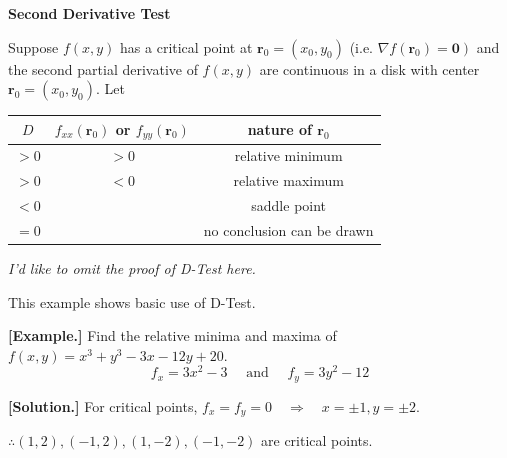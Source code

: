 \documentclass[11pt, a4paper]{MATH2023}
\newcommand{\eg}{\textbf{[Example.] }}
\newcommand{\sol}{\textbf{[Solution.] }}
\begin{document}
\begin{spacing}{1.3}
    \vspace{0.3in}
    {\bf Second Derivative Test}

    Suppose $f(x, y)$ has a critical point at $\mathbf{r}_{0}=\left(x_{0}, y_{0}\right)$ 
    (i.e. $\left.\nabla f\left(\mathbf{r}_{0}\right)=\mathbf{0}\right)$ and the second partial 
    derivative of $f(x, y)$ are continuous in a disk with center $\mathbf{r}_{0}=\left(x_{0}, y_{0}\right) .$ Let
    \begin{center}
    \end{center}
    
    \begin{center}
        \begin{tabular}{c|c|c}
            \hline\hline 
            $D$ & $f_{x x}\left(\mathbf{r}_{0}\right)$ or $f_{y y}\left(\mathbf{r}_{0}\right)$ & nature of $\mathbf{r}_{0}$ \\\hline\hline
            $>0$ & $>0$ & relative minimum \\\hline
            $>0$ & $<0$ & relative maximum \\\hline
            $<0$ & & saddle point \\\hline
            $=0$ & & no conclusion can be drawn \\\hline
        \end{tabular}
    \end{center}
    
    \vspace{0.4in}
    {\it I'd like to omit the proof of D-Test here.}

    \vspace{0.8in}
    {\blue This example shows basic use of D-Test.}

    \eg Find the relative minima and maxima of $f(x, y)=x^{3}+y^{3}-3 x-12 y+20$.
    $$
    f_{x}=3 x^{2}-3 \quad \text { and } \quad f_{y}=3 y^{2}-12
    $$

    \sol 
    For critical points, $f_{x}=f_{y}=0 \quad \Rightarrow \quad x=\pm 1, y=\pm 2$.

    $\therefore (1,2),(-1,2),(1,-2),(-1,-2)$ are critical points.


\end{spacing}
\end{document}
